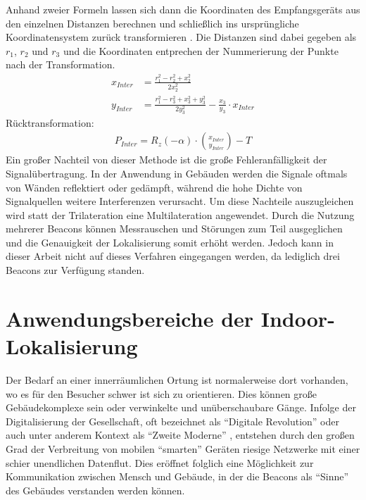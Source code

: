 Anhand zweier Formeln lassen sich dann die Koordinaten des Empfangsgeräts aus den einzelnen Distanzen berechnen und schließlich ins ursprüngliche Koordinatensystem zurück transformieren \cite{Trilat}. Die Distanzen sind dabei gegeben als $r_1$, $r_2$ und $r_3$ und die Koordinaten entprechen der Nummerierung der Punkte nach der Transformation.
\begin{align*}
x_{Inter} &= \frac{r_1^2-r_2^2+x_2^2}{2x_2^2}\\
y_{Inter} &= \frac{r_1^2-r_3^2+x_3^2+y_3^2}{2y_3^2}-\frac{x_3}{y_3}\cdot x_{Inter}
\end{align*}
Rücktransformation:
\begin{align*}
P_{Inter} = R_z\left ( -\alpha \right ) \cdot \binom{x_{Inter}}{y_{Inter}} - T
\end{align*}
Ein großer Nachteil von dieser Methode ist die große Fehleranfälligkeit der Signalübertragung. In der Anwendung in Gebäuden werden die Signale oftmals von Wänden reflektiert oder gedämpft, während die hohe Dichte von Signalquellen weitere Interferenzen verursacht. Um diese Nachteile auszugleichen wird statt der Trilateration eine Multilateration angewendet. Durch die Nutzung mehrerer Beacons können Messrauschen und Störungen zum Teil ausgeglichen und die Genauigkeit der Lokalisierung somit erhöht werden. Jedoch kann in dieser Arbeit nicht auf dieses Verfahren eingegangen werden, da lediglich drei Beacons zur Verfügung standen. 

\section{Anwendungsbereiche der Indoor-Lokalisierung}
Der Bedarf an einer innerräumlichen Ortung ist normalerweise dort vorhanden, wo es für den Besucher schwer ist sich zu orientieren. Dies können große Gebäudekomplexe sein oder verwinkelte und unüberschaubare Gänge. Infolge der Digitalisierung der Gesellschaft, oft bezeichnet als "`Digitale Revolution"' oder auch unter anderem Kontext als "`Zweite Moderne"' \cite{DigRev}, entstehen durch den großen Grad der Verbreitung von mobilen "`smarten"' Geräten riesige Netzwerke mit einer schier unendlichen Datenflut. Dies eröffnet folglich eine Möglichkeit zur Kommunikation zwischen Mensch und Gebäude, in der die Beacons als "`Sinne"' des Gebäudes verstanden werden können.  
